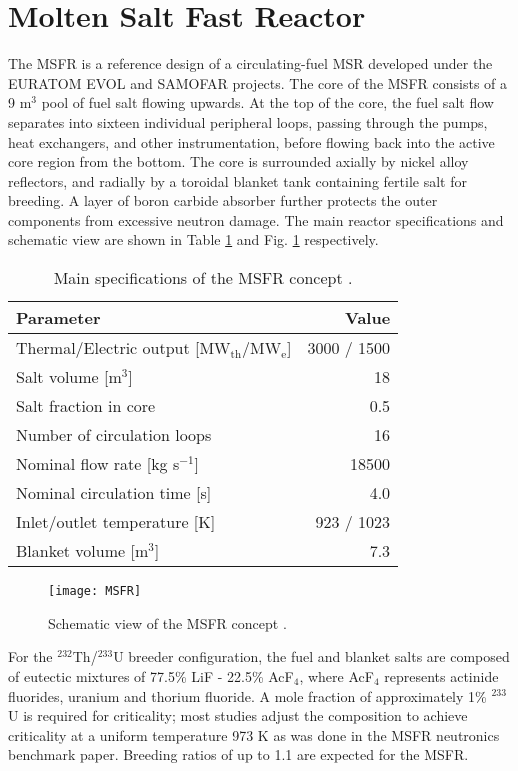 \section{Molten Salt Fast Reactor}

The \gls{MSFR} is a reference design of a circulating-fuel \gls{MSR} developed
under the EURATOM \gls{EVOL} and \gls{SAMOFAR} projects. The core of the
\gls{MSFR} consists of a 9 m$^3$ pool of fuel salt flowing upwards. At the top
of the core, the fuel salt flow separates into sixteen individual peripheral
loops, passing through the pumps, heat exchangers, and other instrumentation,
before flowing back into the active core region from the bottom. The core is
surrounded axially by nickel alloy reflectors, and radially by a toroidal
blanket tank containing fertile salt for
breeding. A layer of boron carbide absorber further protects the outer
components from excessive neutron damage. The main reactor specifications and
schematic view are shown in Table \ref{table:msfr} and Fig. \ref{fig:msfr}
respectively. 

\begin{table}[ht]
	\captionsetup{justification=centering}
	\caption{Main specifications of the \gls{MSFR} concept
				\cite{serp_molten_2014}.}
	\centering
	\begin{tabular}{ l r }
		\hline
		Parameter & Value \\
		\hline
		Thermal/Electric output [MW$_{\text{th}}$/MW$_{\text{e}}$] & 3000 /
		1500 
		\\
		Salt volume [m$^3$] & 18 \\
		Salt fraction in core & 0.5 \\
		Number of circulation loops & 16 \\
		Nominal flow rate [kg s$^{-1}$] & 18500  \\
		Nominal circulation time [s] & 4.0 \\
		Inlet/outlet temperature [K] & 923 / 1023 \\
		Blanket volume [m$^3$] & 7.3\\
		\hline
	\end{tabular}
	\label{table:msfr}
\end{table}

\begin{figure}[ht] 
	\centering
	\texttt{[image: MSFR]}
	\caption{Schematic view of the MSFR concept \cite{serp_molten_2014}.}
	\label{fig:msfr}
\end{figure}

For the $^{232}$Th/$^{233}$U breeder configuration, the fuel and blanket salts
are composed of eutectic mixtures of 77.5\% LiF - 22.5\% AcF$_4$, where
AcF$_4$ represents actinide fluorides, uranium and thorium fluoride. A mole
fraction of approximately 1\% $^{233}$U is required for criticality; most
studies adjust the composition to achieve criticality at a uniform temperature
973 K as was done in the \gls{MSFR} neutronics benchmark paper. Breeding
ratios of up to 1.1 are expected for the \gls{MSFR}.

